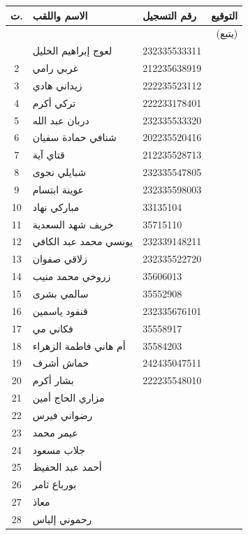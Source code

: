 \documentclass[12pt, a4paper]{article}
\begin{document}
\begin{longtable}{|c|p{}|p{}|c|}
    \hline
    \textbf{ت.} & \textbf{الاسم واللقب} & \textbf{رقم التسجيل} & \textbf{التوقيع} \\
    \hline
    \endhead
    \hline
    \multicolumn{4}{|r|}{(يتبع)} \\
    \endfoot
    \hline
    \endlastfoot
    1 & لعوج إبراهيم الخليل & 232335533311 & \\
    2 & غربي رامي & 212235638919 & \\
    3 & زيداني هادي & 222235523112 & \\
    4 & تركي أكرم & 222233178401 & \\
    5 & دربان عبد الله & 232335533320 & \\
    6 & شنافي حمادة سفيان & 202235520416 & \\
    7 & قتاي آية & 212235528713 & \\
    8 & شبايلي نجوى & 232335547805 & \\
    9 & عوينة ابتسام & 232335598003 & \\
    10 & مباركي نهاد & 33135104 & \\
    11 & خريف شهد السعدية & 35715110 & \\
    12 & يونسي محمد عبد الكافي & 232339148211 & \\
    13 & زلاقي صفوان & 232335522720 & \\
    14 & زروخي محمد منيب & 35606013 & \\
    15 & سالمي بشرى & 35552908 & \\
    16 & قنفود ياسمين & 232335676101 & \\
    17 & فكاني مي & 35558917 & \\
    18 & أم هاني فاطمة الزهراء & 35584203 & \\
    19 & حماش أشرف & 242435047511 & \\
    20 & بشار أكرم & 222235548010 & \\
    21 & مزاري الحاج أمين & \hrulefill & \\
    22 & رضواني فيرس & \hrulefill & \\
    23 & عيمر محمد & \hrulefill & \\
    24 & جلاب مسعود & \hrulefill & \\
    25 & أحمد عبد الحفيظ & \hrulefill & \\
    26 & بورباع ثامر & \hrulefill & \\
    27 & معاذ & \hrulefill & \\
    28 & رحموني إلياس & \hrulefill & \\

\end{longtable}
\end{document}
